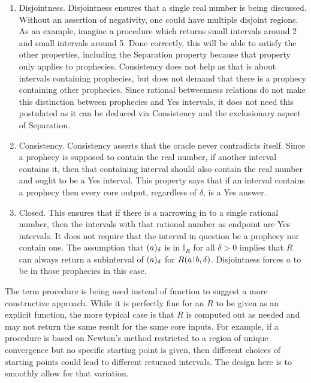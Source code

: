 \documentclass[12pt]{article}
\begin{document}
\begin{enumerate}
 
    \item Disjointness. Disjointness ensures that a single real number is being discussed. Without an assertion of negativity, one could have multiple disjoint regions.  As an example, imagine a procedure which returns small intervals around 2 and small intervals around 5. Done correctly, this will be able to satisfy the other properties, including the Separation property because that property only applies to prophecies. Consistency does not help as that is about intervals containing prophecies, but does not demand that there is a prophecy containing other prophecies.  Since rational betweenness relations do not make this distinction between prophecies and Yes intervals, it does not need this postulated as it can be deduced via Consistency and the exclusionary aspect of Separation. 
    
    \item Consistency. Consistency asserts that the oracle never contradicts itself. Since a prophecy is supposed to contain the real number, if another interval contains it, then that containing interval should also contain the real number and ought to be a Yes interval. This property says that if an interval contains a prophecy then every core output, regardless of $\delta$, is a Yes answer. 
    
    \item Closed. This ensures that if there is a narrowing in to a single rational number, then the intervals with that rational number as endpoint are Yes intervals. It does not require that the interval in question be a prophecy nor contain one. The assumption that $(a)_{\delta}$ is in $\mathbb{I}_R$ for all $\delta >0$ implies that $R$ can always return a subinterval of $(a)_{\delta}$ for $R(a\rint b, \delta)$. Disjointness forces $a$ to be in those prophecies in this case. 

\end{enumerate}

The term procedure is being used instead of function to suggest a more constructive approach. While it is perfectly fine for an $R$ to be given as an explicit function, the more typical case is that $R$ is computed out as needed and may not return the same result for the same core inputs. For example, if a procedure is based on Newton's method restricted to a region of unique convergence but no specific starting point is given, then different choices of starting points could lead to different returned intervals. The design here is to smoothly allow for that variation. 
\end{document}
